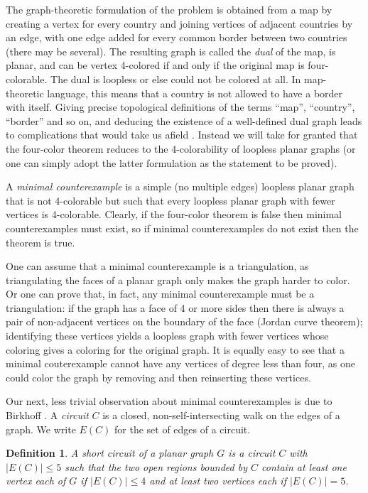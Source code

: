 \documentclass[11pt]{article}
\newtheorem{definition}[theorem]{Definition}
\begin{document}
The graph-theoretic formulation of the problem is obtained from a map by creating a vertex for every country and joining vertices of adjacent countries by an edge, with one edge added for every common border between two countries (there may be several). The resulting graph is called the \emph{dual} of the map, is planar, and can be vertex 4-colored if and only if the original map is four-colorable. The dual is loopless or else could not be colored at all. In map-theoretic language, this means that a country is not allowed to have a border with itself. 
Giving precise topological definitions of the terms ``map'', ``country'', ``border'' and so on, and deducing the existence of a well-defined dual graph leads to complications that would take us afield \cite{fritsch, gonthier}. Instead we will take for granted that the four-color theorem reduces to the 4-colorability of loopless planar graphs (or one can simply adopt the latter formulation as the statement to be proved). 

A \emph{minimal counterexample} is a simple (no multiple edges) loopless planar graph that is not 4-colorable but such that every loopless planar graph with fewer vertices is 4-colorable. Clearly, if the four-color theorem is false then minimal counterexamples must exist, so if minimal counterexamples do not exist then the theorem is true. 

One can assume that a minimal counterexample is a triangulation, as triangulating the faces of a planar graph only makes the graph harder to color. Or one can prove that, in fact, any minimal counterexample must be a triangulation: if the graph has a face of 4 or more sides then there is always a pair of non-adjacent vertices on the boundary of the face (Jordan curve theorem); identifying these vertices yields a loopless graph with fewer vertices whose coloring gives a coloring for the original graph. It is equally easy to see that a minimal couterexample cannot have any vertices of degree less than four, as one could color the graph by removing and then reinserting these vertices.

Our next, less trivial observation about minimal counterexamples is due to Birkhoff \cite{birkhoff}. A \emph{circuit} $C$ is a closed, non-self-intersecting walk on the edges of a graph. We write $E(C)$ for the set of edges of a circuit.


\begin{definition}\label{shortcircuitdef}
A \emph{short circuit} of a planar graph $G$ is a circuit $C$ with $|E(C)| \leq 5$ such that the two open regions bounded by $C$ contain at least one vertex each of $G$ if $|E(C)| \leq 4$ and at least two vertices each if $|E(C)| = 5$.
\end{definition}
\end{document}
